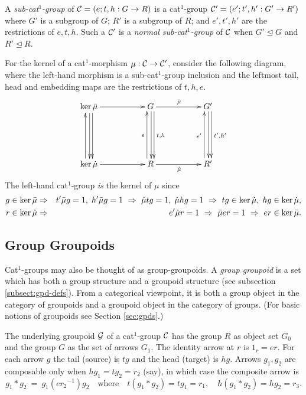 A \emph{sub-cat$^1$-group} of $\mathcal{C} = (e;t,h : G \to R)$ 
is a cat$^1$-group $\mathcal{C}' = (e';t',h' : G' \to R')$ where 
$G'$ is a subgroup of $G$; $R'$ is a subgroup of $R$; 
and $e',t',h'$ are the restrictions of $e,t,h$. 
Such a $\mathcal{C}'$ is a \emph{normal sub-cat$^1$-group} of $\mathcal{C}$ 
when $G' \unlhd G$ and $R' \unlhd R$. 

For the kernel of a cat$^1$-morphism $\mu : \mathcal{C} \to \mathcal{C}'$, 
consider the following diagram, where the left-hand morphism is a 
sub-cat$^1$-group inclusion and the leftmost tail, head and embedding maps 
are the restrictions of $t,h,e$. 
\begin{equation*} \label{eq:cat1kernel}
\vcenter{\xymatrix{
   \ker\barm \ar[rr] \ar[dd]<1.0ex> \ar[dd]<0.2ex> 
     && G \ar[dd]<1.0ex>^{t,h} \ar[dd]<0.2ex> \ar[rr]^{\barm}
          && G' \ar[dd]<1.0ex>^{t',h'} \ar[dd]<0.2ex>  \\
     &&  \\
   \ker\dm \ar[rr] \ar[uu]<1.0ex> 
     && R \ar[uu]<1.0ex>^{e} \ar[rr]_{\dm}
          && R' \ar[uu]<1.0ex>^{e'} 
}}
\end{equation*}
The left-hand cat$^1$-group \emph{is} the kernel of $\mu$ since 
\begin{eqnarray*}
g \in \ker\bar{\mu} 
  & \Rightarrow 
    & t'\bar{\mu} g = 1,\; h'\bar{\mu} g = 1 ~\Rightarrow~ 
      \dot{\mu} tg = 1,\; \dot{\mu} hg = 1 ~\Rightarrow~ 
      tg \in \ker\dot{\mu},\; hg \in \ker\dot{\mu}, \\
r \in \ker\dot{\mu} 
  & \Rightarrow 
    & e'\dot{\mu} r = 1 ~\Rightarrow~ 
      \bar{\mu} er = 1 ~\Rightarrow~ 
      er \in \ker\bar{\mu}. 
\end{eqnarray*}

\subsection{Group Groupoids} \label{subs:gpgpd}  

Cat$^1$-groups may also be thought of as group-groupoids.
A \emph{group groupoid} is a set which has both a group structure and
a groupoid structure (see subsection \ref{subsect:gpd-defs}). 
From a categorical viewpoint, it is both a group object in the
category of groupoids and a groupoid object in the category of groups.
(For basic notions of groupoids see Section \ref{sec:gpds}.) 

The underlying groupoid $\mathcal{G}$  of a cat$^1$-group  $\mathcal{C}$ 
has the group $R$ as object set $G_0$ 
and the group $G$ as the set of arrows $G_1$. 
The identity arrow at  $r$  is  $1_r = er$. 
For each arrow  $g$  the tail (source) is  $tg$ and the head (target) is $hg$. 
Arrows  $g_1,g_2$  are composable only when  $hg_1 = tg_2 = r_2$ (say),
in which case the composite arrow is
\begin{equation} \label{eq:gpgpd-comp}
g_1 * g_2 ~=~ g_1(e{r_2}^{-1})g_2 
\quad\mbox{where}\quad
t(g_1 * g_2) = tg_1 = r_1, \quad
h(g_1 * g_2) = hg_2 = r_3.
\end{equation}

